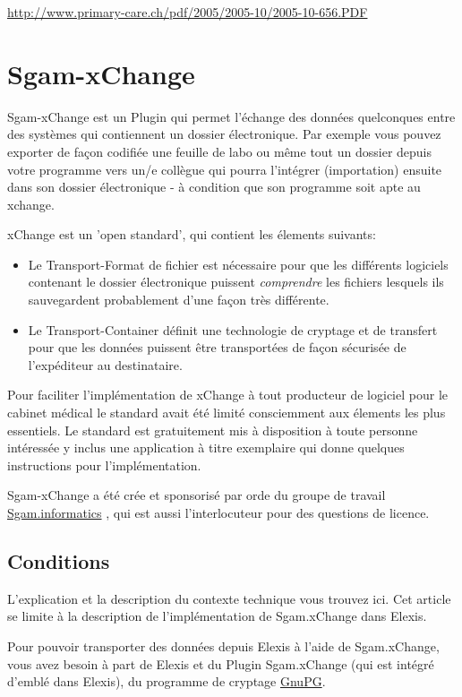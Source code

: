 \href{http://www.primary-care.ch/pdf/2005/2005-10/2005-10-656.PDF}{http://www.primary-care.ch/pdf/2005/2005-10/2005-10-656.PDF}


\section{Sgam-xChange}
Sgam-xChange est un Plugin qui permet l'échange des données quelconques entre des systèmes qui contiennent un dossier électronique. Par exemple vous pouvez exporter de façon codifiée une feuille de labo ou même tout un dossier depuis votre programme vers un/e collègue qui pourra l'intégrer (importation) ensuite dans son dossier électronique - à condition que son programme soit apte au xchange.

xChange est un 'open standard', qui contient les élements suivants:
\begin{itemize}
 \item Le Transport-Format de fichier est nécessaire pour que les différents logiciels contenant le dossier électronique puissent  \textit{comprendre} les fichiers lesquels ils sauvegardent probablement d'une façon très différente.
\item Le Transport-Container définit une technologie de cryptage et de transfert pour que les données puissent être transportées de façon sécurisée de l'expéditeur au destinataire.
\end{itemize}
Pour faciliter l'implémentation de xChange à tout producteur de logiciel pour le cabinet médical le standard avait été limité consciemment aux élements les plus essentiels. Le standard est gratuitement mis à disposition à toute personne intéressée y inclus une application à titre exemplaire qui donne quelques instructions pour l'implémentation.

Sgam-xChange a été crée et sponsorisé par orde du groupe de travail  \href{http://www.sgam.ch/informatics}{Sgam.informatics} , qui est aussi l'interlocuteur pour des questions de licence.

\subsection{Conditions}


L'explication et la description du contexte technique vous trouvez ici. Cet article se limite à la description de l'implémentation de Sgam.xChange dans Elexis.

Pour pouvoir transporter des données depuis Elexis à l'aide de Sgam.xChange, vous avez besoin à part de Elexis et du Plugin Sgam.xChange (qui est intégré d'emblé dans Elexis), du programme de cryptage \href{http://www.gnupg.org}{GnuPG}.

